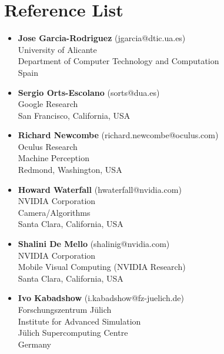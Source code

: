 \documentclass[8pt]{article}
\begin{document}
\section*{Reference List}
\begin{itemize}
	\item {\textbf{Jose Garcia-Rodriguez} (jgarcia@dtic.ua.es)\\
    University of Alicante\\
    Department of Computer Technology and Computation\\
    Spain\\}
    \item {\textbf{Sergio Orts-Escolano} (sorts@dua.es)\\
    Google Research\\
    San Francisco, California, USA\\}

  \item {\textbf{Richard Newcombe} (richard.newcombe@oculus.com)\\
  Oculus Research\\
  Machine Perception\\
    Redmond, Washington, USA\\}

  \item {\textbf{Howard Waterfall} (hwaterfall@nvidia.com)\\
	NVIDIA Corporation\\
	Camera/Algorithms\\
	Santa Clara, California, USA\\}

  \item{\textbf{Shalini De Mello} (shalinig@nvidia.com)\\
	NVIDIA Corporation\\
	Mobile Visual Computing (NVIDIA Research)\\
	Santa Clara, California, USA\\}

  \item {\textbf{Ivo Kabadshow} (i.kabadshow@fz-juelich.de)\\
    Forschungszentrum Jülich\\
    Institute for Advanced Simulation\\
    Jülich Supercomputing Centre\\
    Germany\\}


\end{itemize}
 
\end{document}
